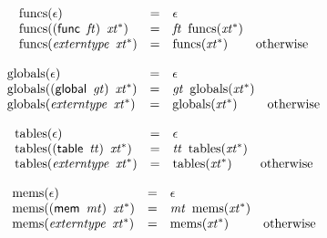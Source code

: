 \vspace{1ex}

$$
\begin{array}{@{}lcl@{}l@{}}
{\mathrm{funcs}}(\epsilon) &=& \epsilon &  \\
{\mathrm{funcs}}((\mathsf{func}~\,{\mathit{ft}})~\,{{\mathit{xt}}^\ast}) &=& {\mathit{ft}}~\,{\mathrm{funcs}}({{\mathit{xt}}^\ast}) &  \\
{\mathrm{funcs}}({\mathit{externtype}}~\,{{\mathit{xt}}^\ast}) &=& {\mathrm{funcs}}({{\mathit{xt}}^\ast}) &\quad
  \mbox{otherwise} \\
\end{array}
$$

$$
\begin{array}{@{}lcl@{}l@{}}
{\mathrm{globals}}(\epsilon) &=& \epsilon &  \\
{\mathrm{globals}}((\mathsf{global}~\,{\mathit{gt}})~\,{{\mathit{xt}}^\ast}) &=& {\mathit{gt}}~\,{\mathrm{globals}}({{\mathit{xt}}^\ast}) &  \\
{\mathrm{globals}}({\mathit{externtype}}~\,{{\mathit{xt}}^\ast}) &=& {\mathrm{globals}}({{\mathit{xt}}^\ast}) &\quad
  \mbox{otherwise} \\
\end{array}
$$

$$
\begin{array}{@{}lcl@{}l@{}}
{\mathrm{tables}}(\epsilon) &=& \epsilon &  \\
{\mathrm{tables}}((\mathsf{table}~\,{\mathit{tt}})~\,{{\mathit{xt}}^\ast}) &=& {\mathit{tt}}~\,{\mathrm{tables}}({{\mathit{xt}}^\ast}) &  \\
{\mathrm{tables}}({\mathit{externtype}}~\,{{\mathit{xt}}^\ast}) &=& {\mathrm{tables}}({{\mathit{xt}}^\ast}) &\quad
  \mbox{otherwise} \\
\end{array}
$$

$$
\begin{array}{@{}lcl@{}l@{}}
{\mathrm{mems}}(\epsilon) &=& \epsilon &  \\
{\mathrm{mems}}((\mathsf{mem}~\,{\mathit{mt}})~\,{{\mathit{xt}}^\ast}) &=& {\mathit{mt}}~\,{\mathrm{mems}}({{\mathit{xt}}^\ast}) &  \\
{\mathrm{mems}}({\mathit{externtype}}~\,{{\mathit{xt}}^\ast}) &=& {\mathrm{mems}}({{\mathit{xt}}^\ast}) &\quad
  \mbox{otherwise} \\
\end{array}
$$

\vspace{1ex}

